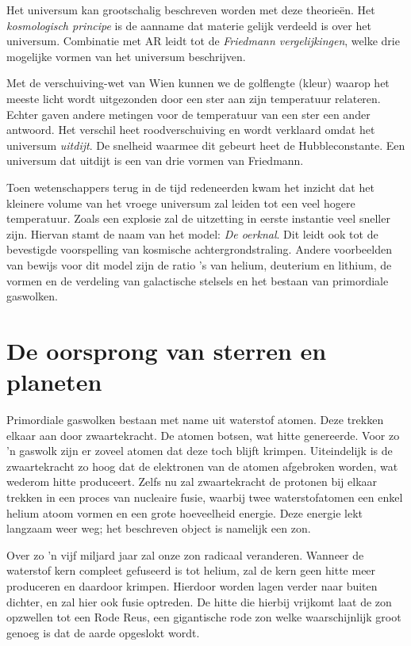 \documentclass{article}
\begin{document}
        Het universum kan grootschalig beschreven worden met deze theorie\"en. Het \emph{kosmologisch principe} is de aanname dat materie gelijk verdeeld is over het universum. Combinatie met AR leidt tot de \emph{Friedmann vergelijkingen}, welke drie mogelijke vormen van het universum beschrijven.
        
        Met de verschuiving-wet van Wien kunnen we de golflengte (kleur) waarop het meeste licht wordt uitgezonden door een ster aan zijn temperatuur relateren. Echter gaven andere metingen voor de temperatuur van een ster een ander antwoord. Het verschil heet roodverschuiving en wordt verklaard omdat het universum \emph{uitdijt}. De snelheid waarmee dit gebeurt heet de Hubbleconstante. Een universum dat uitdijt is een van drie vormen van Friedmann.
        
        Toen wetenschappers terug in de tijd redeneerden kwam het inzicht dat het kleinere volume van het vroege universum zal leiden tot een veel hogere temperatuur. Zoals een explosie zal de uitzetting in eerste instantie veel sneller zijn. Hiervan stamt de naam van het model: \emph{De oerknal}. Dit leidt ook tot de bevestigde voorspelling van kosmische achtergrondstraling. Andere voorbeelden van bewijs voor dit model zijn de ratio 's van helium, deuterium en lithium, de vormen en de verdeling van galactische stelsels en het bestaan van primordiale gaswolken.
        
    \section{De oorsprong van sterren en planeten}         
        Primordiale gaswolken bestaan met name uit waterstof atomen. Deze trekken elkaar aan door zwaartekracht. De atomen botsen, wat hitte genereerde. Voor zo 'n gaswolk zijn er zoveel atomen dat deze toch blijft krimpen. Uiteindelijk is de zwaartekracht zo hoog dat de elektronen van de atomen afgebroken worden, wat wederom hitte produceert. Zelfs nu zal zwaartekracht de protonen bij elkaar trekken in een proces van nucleaire fusie, waarbij twee waterstofatomen een enkel helium atoom vormen en een grote hoeveelheid energie. Deze energie lekt langzaam weer weg; het beschreven object is namelijk een zon.
        
        Over zo 'n vijf miljard jaar zal onze zon radicaal veranderen. Wanneer de waterstof kern compleet gefuseerd is tot helium, zal de kern geen hitte meer produceren en daardoor krimpen. Hierdoor worden lagen verder naar buiten dichter, en zal hier ook fusie optreden. De hitte die hierbij vrijkomt laat de zon opzwellen tot een Rode Reus, een gigantische rode zon welke waarschijnlijk groot genoeg is dat de aarde opgeslokt wordt.
        
\end{document}
